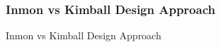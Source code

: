 
\begin{frame}
    \frametitle{Inmon vs Kimball Design Approach }

    Inmon vs Kimball Design Approach

\end{frame}
%
%
%
%
%
%
%
%

